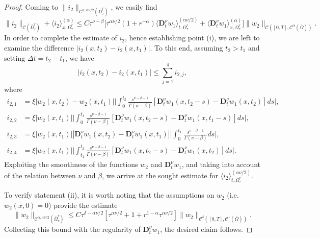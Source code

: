 \documentclass[10pt,a4paper]{amsart}
\def\C {\mathcal{C}}
\begin{document}
\begin{proof}
\noindent
Coming to $\|i_2\|_{\C^{\alpha,\alpha\nu/2}(\bar{\Omega}_{\tau}^{r})}$, we easily find
\[
\|i_2\|_{\C(\bar{\Omega}_{\tau}^{r})}+\langle i_2\rangle_{x,\Omega_{\tau}^{r}}^{(\alpha)}
\leq C\tau^{\nu-\beta}\Big[\tau^{\alpha\nu/2}(1+r^{-\alpha})\langle\mathbf{D}_{t}^{\nu}w_1\rangle_{t,\Omega_{\tau}^{r}}^{(\alpha\nu/2)}
+
\langle\mathbf{D}_{t}^{\nu}w_1\rangle_{x,\Omega_{\tau}^{r}}^{(\alpha)}
\Big]\|w_2\|_{\C([0,T],\C^{\alpha}(\bar{\Omega}))}.
\]
In order to complete the estimate of $i_2$, hence establishing
point (i), we are left to examine the difference $|i_2(x,t_2)-i_2(x,t_1)|$. To this end, assuming $t_2>t_1$ and setting $\Delta t=t_2-t_1$, we have
\[
|i_2(x,t_2)-i_2(x,t_1)|\leq \sum_{j=1}^{4}i_{2,j},
\]
where
\begin{align*}
i_{2,1}&=\xi|w_{2}(x,t_2)-w_{2}(x,t_1)|\Big|\int_{0}^{t_2}\frac{s^{\nu-\beta-1}}{\Gamma(\nu-\beta)}[\mathbf{D}_{t}^{\nu}w_1(x,t_{2}-s)-
\mathbf{D}_{t}^{\nu}w_1(x,t_{2})]ds\Big|,\\
i_{2,2}&=\xi|w_{2}(x,t_1)|\Big|\int_{0}^{t_1}\frac{s^{\nu-\beta-1}}{\Gamma(\nu-\beta)}[\mathbf{D}_{t}^{\nu}w_1(x,t_{2}-s)-
\mathbf{D}_{t}^{\nu}w_1(x,t_{1}-s)]ds\Big|,\\
i_{2,3}&=\xi|w_{2}(x,t_1)||\mathbf{D}_{t}^{\nu}w_1(x,t_{2})-\mathbf{D}_{t}^{\nu}w_1(x,t_{1})|\bigg|\int_{0}^{t_1}\frac{s^{\nu-\beta-1}}{\Gamma(\nu-\beta)}ds\bigg|,\\
i_{2,4}&=\xi|w_{2}(x,t_1)|\bigg|\int_{t_1}^{t_2}\frac{s^{\nu-\beta-1}}{\Gamma(\nu-\beta)}[\mathbf{D}_{t}^{\nu}w_1(x,t_{2}-s)-\mathbf{D}_{t}^{\nu}w_1(x,t_{2})]ds\bigg|.
\end{align*}
Exploiting the smoothness of the functions $w_2$ and $\mathbf{D}_{t}^{\nu}w_1$, and taking into account of the relation between $\nu$ and $\beta$, we arrive at the sought estimate
for $\langle i_2\rangle_{t,\Omega_{\tau}^{r}}^{(\alpha\nu/2)}$.

To verify statement (ii), it is worth noting that
the assumptions on $w_2$ (i.e. $w_2(x,0)=0$) provide the estimate
\[
\|w_2\|_{\C^{\alpha,\alpha\nu/2}(\bar{\Omega}_{\tau}^{r})}\leq C\tau^{\delta-\alpha\nu/2}
[\tau^{\alpha\nu/2}+1+r^{1-\alpha}\tau^{\alpha\nu/2}]\|w_2\|_{\C^{\delta}([0,T],\C^{1}(\bar{\Omega}))}.
\]
Collecting this bound with the regularity of $\mathbf{D}_{t}^{\nu}w_1$, the desired claim follows.


\end{proof}
\end{document}
